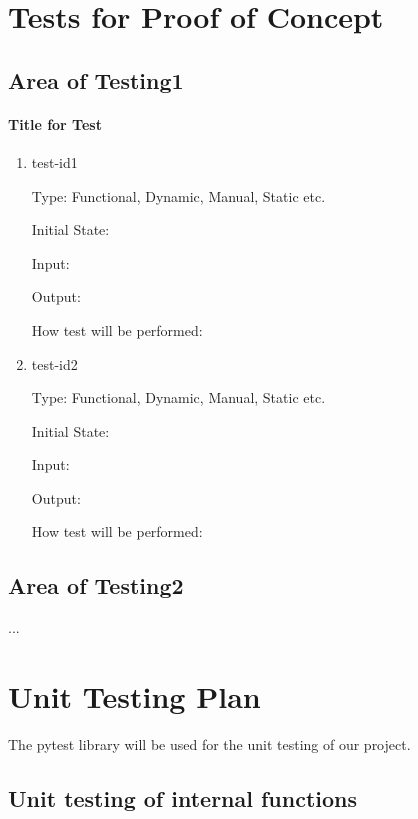 \documentclass[12pt, titlepage]{article}
\begin{document}
\section{Tests for Proof of Concept}

\subsection{Area of Testing1}
		
\paragraph{Title for Test}

\begin{enumerate}

\item{test-id1\\}

Type: Functional, Dynamic, Manual, Static etc.
					
Initial State: 
					
Input: 
					
Output: 
					
How test will be performed: 
					
\item{test-id2\\}

Type: Functional, Dynamic, Manual, Static etc.
					
Initial State: 
					
Input: 
					
Output: 
					
How test will be performed: 

\end{enumerate}

\subsection{Area of Testing2}

...
	
\section{Unit Testing Plan}

The pytest library will be used for the unit testing of our project.
		
\subsection{Unit testing of internal functions}
\end{document}
